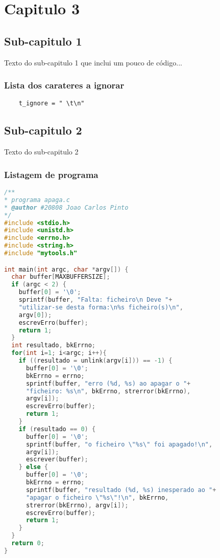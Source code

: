 
\chapter{Capitulo 3}

\section{Sub-capitulo 1}
Texto do sub-capitulo 1 que inclui um pouco de código...

\subsection{Lista dos carateres a ignorar}
\begin{Verbatim}
	t_ignore = " \t\n"
\end{Verbatim}
\hfill \break

\section{Sub-capitulo 2}
Texto do sub-capitulo 2

\subsection{Listagem de programa}
\begin{lstlisting}[language={c},
caption={Código do programa: \textbf{apaga}.},
label=lst:p1e]
/**
* programa apaga.c
* @author #20808 Joao Carlos Pinto
*/
#include <stdio.h>
#include <unistd.h>
#include <errno.h>
#include <string.h>
#include "mytools.h"

int main(int argc, char *argv[]) {
  char buffer[MAXBUFFERSIZE];
  if (argc < 2) {
    buffer[0] = '\0';
    sprintf(buffer, "Falta: ficheiro\n Deve "+
    "utilizar-se desta forma:\n%s ficheiro(s)\n", 
    argv[0]);
    escrevErro(buffer);
    return 1;
  }
  int resultado, bkErrno;
  for(int i=1; i<argc; i++){
    if ((resultado = unlink(argv[i])) == -1) {
      buffer[0] = '\0';
      bkErrno = errno;
      sprintf(buffer, "erro (%d, %s) ao apagar o "+
      "ficheiro: %s\n", bkErrno, strerror(bkErrno), 
      argv[i]);
      escrevErro(buffer);
      return 1;
    }
    if (resultado == 0) {
      buffer[0] = '\0';
      sprintf(buffer, "o ficheiro \"%s\" foi apagado!\n", 
      argv[i]);
      escrever(buffer);
    } else {
      buffer[0] = '\0';
      bkErrno = errno;
      sprintf(buffer, "resultado (%d, %s) inesperado ao "+
      "apagar o ficheiro \"%s\"!\n", bkErrno, 
      strerror(bkErrno), argv[i]);
      escrevErro(buffer);
      return 1;
    }
  }
  return 0;
}
\end{lstlisting}
